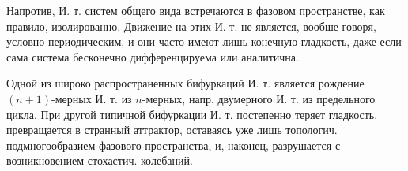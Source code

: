 \documentclass[10pt]{article}
\begin{document}
Напротив, И. т. систем общего вида встречаются в фазовом пространстве, как правило, изолированно. Движение на этих И. т. не является, вообше говоря, условно-периодическим, и они часто имеют лишь конечную гладкость, даже если сама система бесконечно дифференцируема или аналитична.



Одной из широко распространенных бифуркаций И. т. является рождение $(n+1)$-мерных И. т. из $n$-мерных, напр. двумерного И. т. из предельного цикла. При другой типичной бифуркации И. т. постепенно теряет гладкость, превращается в странный аттрактор, оставаясь уже лишь топологич. подмногообразием фазового пространства, и, наконец, разрушается с возникновением стохастич. колебаний.
\end{document}
